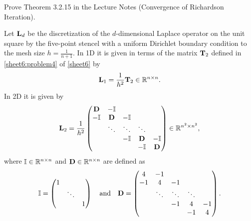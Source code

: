 
\begin{Sheet}
  \label{sheet7}

  \begin{Problem}
    Prove Theorem 3.2.15 in the Lecture Notes (Convergence of Richardson Iteration).
  \end{Problem}

  \begin{Problem}[Programming]
    \label{sheet7:problem3}
    Let $\mathbf L_d$ be the discretization of the $d$-dimensional Laplace
    operator on the unit square by the five-point stencel with a
    uniform Dirichlet boundary condition to the mesh size
    $h=\frac1{n+1}$.  In 1D it is given in terms of the matrix
    $\mathbf T_2$ defined in \cref{sheet6:problem4} of \cref{sheet6} by
    \begin{gather*}
    \mathbf L_1 = \frac1{h^2}\mathbf T_2 \in\mathbb R^{n\times n}.
    \end{gather*}
    In 2D it is given by
    \begin{gather*}
    \mathbf L_2 = \frac1{h^2}
    \begin{pmatrix}
    \mathbf D &   -\mathbb I & & & \\
    -\mathbb I &  \mathbf D & -\mathbb I   & & \\
    & \ddots & \ddots & \ddots & \\
    &        &   -\mathbb I &  \mathbf D &   -\mathbb I\\
    &        &        &   -\mathbb I &  \mathbf D
    \end{pmatrix}
    \in\mathbb R^{n^2\times n^2},
    \end{gather*}
    where $\mathbb I\in\mathbb R^{n\times n}$ and $\mathbf D\in\mathbb R^{n\times n}$ are
    defined as
    \begin{gather*}
    \mathbb I =
    \begin{pmatrix}
    1 & & \\
    & \ddots & \\
    &        & 1
    \end{pmatrix}
    \quad\text{and}\quad
    \mathbf D =
    \begin{pmatrix}
    4 & -1 &    && \\
    -1 &  4 & -1 && \\
    & \ddots & \ddots & \ddots & \\
    &    & -1 & 4 & -1 \\
    &    &    & -1 & 4
    \end{pmatrix}.
    \end{gather*}
    

\end{Problem}
\end{Sheet}

